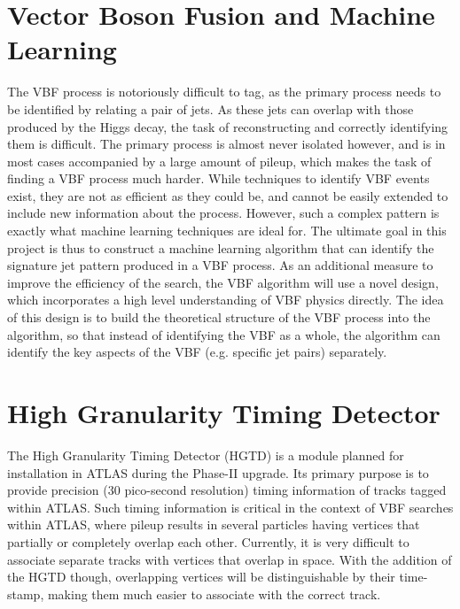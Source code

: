 \documentclass[12pt,letterpaper]{article}
\begin{document}
\section*{Vector Boson Fusion and Machine Learning}
    The VBF process is notoriously difficult to tag, as the primary process needs to be identified by relating a pair of jets. As these jets can overlap with those produced by the Higgs decay, the task of reconstructing and correctly identifying them is difficult. The primary process is almost never isolated however, and is in most cases accompanied by a large amount of pileup, which makes the task of finding a VBF process much harder. While techniques to identify VBF events exist, they are not as efficient as they could be, and cannot be easily extended to include new information about the process. However, such a complex pattern is exactly what machine learning techniques are ideal for. The ultimate goal in this project is thus to construct a machine learning algorithm that can identify the signature jet pattern produced in a VBF process. As an additional measure to improve the efficiency of the search, the VBF algorithm will use a novel design, which incorporates a high level understanding of VBF physics directly. The idea of this design is to build the theoretical structure of the VBF process into the algorithm, so that instead of identifying the VBF as a whole, the algorithm can identify the key aspects of the VBF (e.g. specific jet pairs) separately.



\section*{High Granularity Timing Detector}
    The High Granularity Timing Detector (HGTD) is a module planned for installation in ATLAS during the Phase-II upgrade. Its primary purpose is to provide precision (30 pico-second resolution) timing information of tracks tagged within ATLAS. Such timing information is critical in the context of VBF searches within ATLAS, where pileup results in several particles having vertices that partially or completely overlap each other. Currently, it is very difficult to associate separate tracks with vertices that overlap in space. With the addition of the HGTD though, overlapping vertices will be distinguishable by their time-stamp, making them much easier to associate with the correct track. 
    
\end{document}

